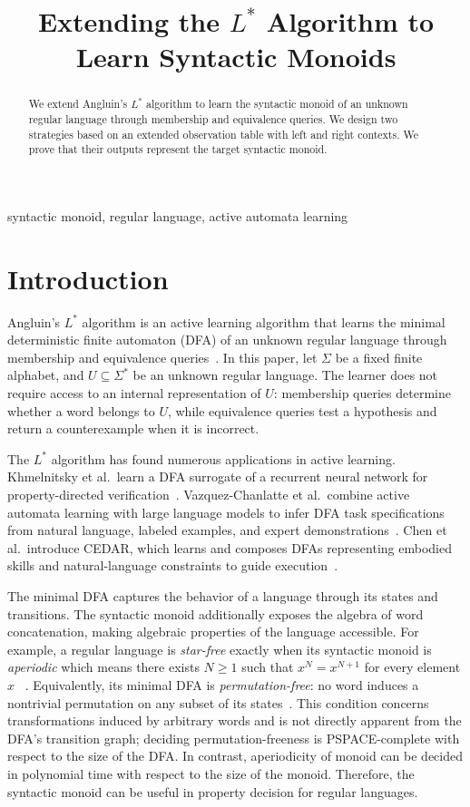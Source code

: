 \documentclass{ieice-tecrep}
\title{Extending the $L^*$ Algorithm to Learn Syntactic Monoids}
\subtitle{}
\begin{document}
\begin{abstract}
We extend Angluin's \(L^*\) algorithm to learn the syntactic monoid of an
unknown regular language through membership and equivalence queries. We design two
strategies based on an extended observation table with left and right contexts. 
We prove that their outputs
represent the target syntactic monoid.
\end{abstract}
\begin{keyword}
syntactic monoid, regular language, active automata learning
\end{keyword}
\maketitle

\section{Introduction}\label{introduction}

Angluin's \(L^*\) algorithm is an active learning algorithm that learns the minimal deterministic
finite automaton (DFA) of an unknown regular language through
membership and equivalence queries~\cite{angluin87}. In this paper, let \(\Sigma\) be a fixed finite alphabet, 
and \(U\subseteq\Sigma^*\) be an unknown regular language. 
The learner does not require access to an internal representation of \(U\):
membership queries determine whether a word belongs to \(U\), while
equivalence queries test a hypothesis and return a counterexample when
it is incorrect.

The \(L^*\) algorithm has found numerous applications in active learning.
Khmelnitsky et al.\ learn a DFA
surrogate of a recurrent neural network for property-directed
verification~\cite{khmelnitsky2020property}.
Vazquez-Chanlatte et al.\ combine active automata learning with large
language models to infer DFA task specifications from natural language,
labeled examples, and expert demonstrations~\cite{vazquezchanlatte2025lstarlm}.
Chen et al.\ introduce CEDAR, which learns and composes DFAs
representing embodied skills and natural-language constraints to guide
execution~\cite{chen2026cedar}.

The minimal DFA captures the behavior of a language through its states
and transitions. The syntactic monoid additionally exposes the algebra
of word concatenation, making algebraic properties of the language
accessible. For example, a regular language is \emph{star-free} exactly when
its syntactic monoid is \emph{aperiodic} which means there exists \(N\ge1\) such that \(x^N=x^{N+1}\) for every
element \(x\) ~\cite{SCHUTZENBERGER1965190}.
Equivalently, its minimal DFA is \emph{permutation-free}: no word induces
a nontrivial permutation on any subset of its
states~\cite{mcnaughton1971counterfree}. This condition concerns
transformations induced by arbitrary words and is not directly apparent
from the DFA's transition graph; deciding permutation-freeness is
PSPACE-complete with respect to the size of the DFA. In contrast, aperiodicity of monoid 
can be decided in polynomial time with respect to the size of the monoid.
Therefore, the syntactic monoid can be useful in property decision for regular languages. 
\end{document}
